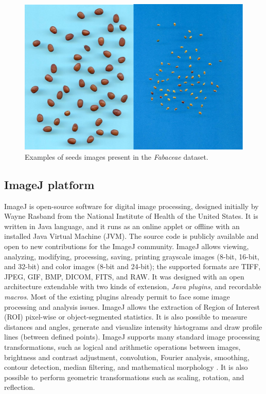 \documentclass[a4paper,12pt]{article}
\begin{document}
\begin{figure}[tbp]
	\centerline{\includegraphics[scale=0.5]{Img/Sardinia.png}}
	\caption{Examples of seeds images present in the \emph{Fabaceae} dataset.}
	\label{Sardinia}
\end{figure}

\subsection{ImageJ platform}
ImageJ \cite{ImageJ} is open-source software for digital image processing, designed initially by Wayne Rasband from the National Institute of Health of the United States. It is written in Java language, and it runs as an online applet or offline with an installed Java Virtual Machine (JVM). The source code is publicly available and open to new contributions for the ImageJ community. ImageJ allows viewing, analyzing, modifying, processing, saving, printing grayscale images (8-bit, 16-bit, and 32-bit) and color images (8-bit and 24-bit); the supported formats are TIFF, JPEG, GIF, BMP, DICOM, FITS, and RAW. It was designed with an open architecture extendable with two kinds of extension, \emph{Java plugins}, and recordable \emph{macros}. Most of the existing plugins already permit to face some image processing and analysis issues.
ImageJ allows the extraction of Region of Interest (ROI) pixel-wise or object-segmented statistics. It is also possible to measure distances and angles, generate and visualize intensity histograms and draw profile lines (between defined points). ImageJ supports many standard image processing transformations, such as logical and arithmetic operations between images, brightness and contrast adjustment, convolution, Fourier analysis, smoothing, contour detection, median filtering, and mathematical morphology \cite{Gonz_2018}. It is also possible to perform geometric transformations such as scaling, rotation, and reflection.
\end{document}
